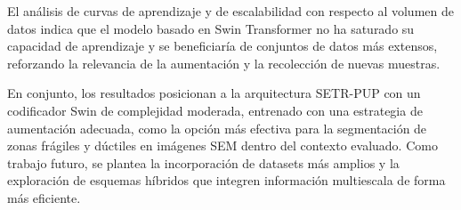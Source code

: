 \documentclass[onecolumn, 12pt , journal]{IEEEtran}
\begin{document}
El análisis de curvas de aprendizaje y de escalabilidad con respecto al volumen de datos indica que el modelo basado en Swin Transformer no ha saturado su capacidad de aprendizaje y se beneficiaría de conjuntos de datos más extensos, reforzando la relevancia de la aumentación y la recolección de nuevas muestras.

En conjunto, los resultados posicionan a la arquitectura SETR-PUP con un codificador Swin de complejidad moderada, entrenado con una estrategia de aumentación adecuada, como la opción más efectiva para la segmentación de zonas frágiles y dúctiles en imágenes SEM dentro del contexto evaluado. Como trabajo futuro, se plantea la incorporación de datasets más amplios y la exploración de esquemas híbridos que integren información multiescala de forma más eficiente.



\end{document}
